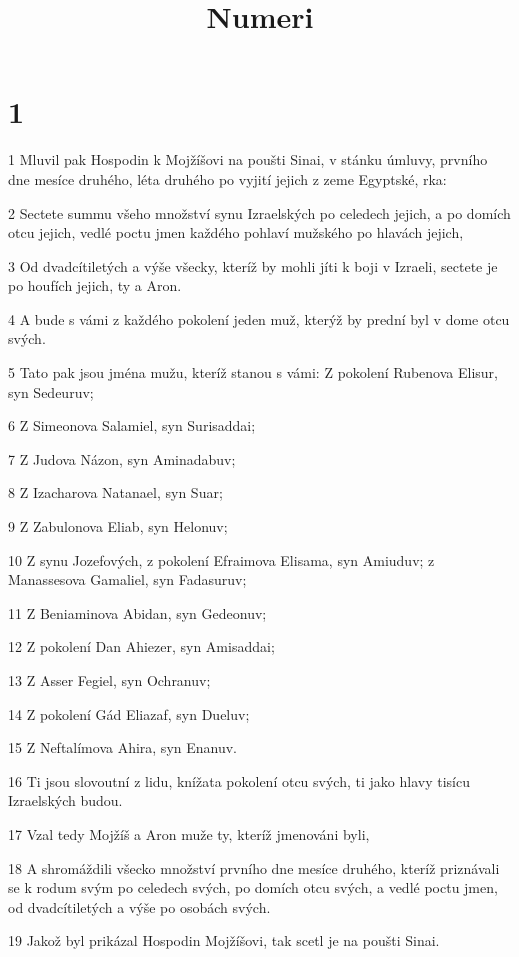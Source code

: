 

\title{Numeri}

\chapter{1}

\par 1 Mluvil pak Hospodin k Mojžíšovi na poušti Sinai, v stánku úmluvy, prvního dne mesíce druhého, léta druhého po vyjití jejich z zeme Egyptské, rka:
\par 2 Sectete summu všeho množství synu Izraelských po celedech jejich, a po domích otcu jejich, vedlé poctu jmen každého pohlaví mužského po hlavách jejich,
\par 3 Od dvadcítiletých a výše všecky, kteríž by mohli jíti k boji v Izraeli, sectete je po houfích jejich, ty a Aron.
\par 4 A bude s vámi z každého pokolení jeden muž, kterýž by prední byl v dome otcu svých.
\par 5 Tato pak jsou jména mužu, kteríž stanou s vámi: Z pokolení Rubenova Elisur, syn Sedeuruv;
\par 6 Z Simeonova Salamiel, syn Surisaddai;
\par 7 Z Judova Názon, syn Aminadabuv;
\par 8 Z Izacharova Natanael, syn Suar;
\par 9 Z Zabulonova Eliab, syn Helonuv;
\par 10 Z synu Jozefových, z pokolení Efraimova Elisama, syn Amiuduv; z Manassesova Gamaliel, syn Fadasuruv;
\par 11 Z Beniaminova Abidan, syn Gedeonuv;
\par 12 Z pokolení Dan Ahiezer, syn Amisaddai;
\par 13 Z Asser Fegiel, syn Ochranuv;
\par 14 Z pokolení Gád Eliazaf, syn Dueluv;
\par 15 Z Neftalímova Ahira, syn Enanuv.
\par 16 Ti jsou slovoutní z lidu, knížata pokolení otcu svých, ti jako hlavy tisícu Izraelských budou.
\par 17 Vzal tedy Mojžíš a Aron muže ty, kteríž jmenováni byli,
\par 18 A shromáždili všecko množství prvního dne mesíce druhého, kteríž priznávali se k rodum svým po celedech svých, po domích otcu svých, a vedlé poctu jmen, od dvadcítiletých a výše po osobách svých.
\par 19 Jakož byl prikázal Hospodin Mojžíšovi, tak scetl je na poušti Sinai.
